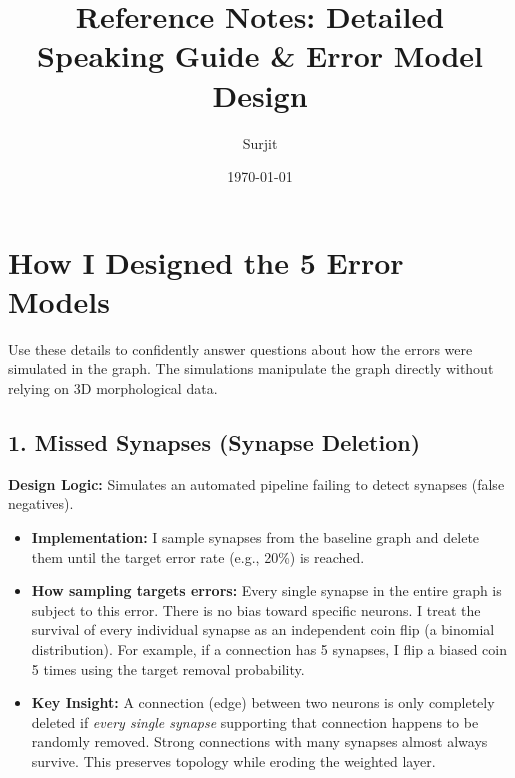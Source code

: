 \documentclass[11pt]{article}
\title{Reference Notes: Detailed Speaking Guide \& Error Model Design}
\author{Surjit}
\date{\today}
\begin{document}
\maketitle

\section{How I Designed the 5 Error Models}
Use these details to confidently answer questions about how the errors were simulated in the graph. The simulations manipulate the graph directly without relying on 3D morphological data.

\subsection*{1. Missed Synapses (Synapse Deletion)}
\textbf{Design Logic:} Simulates an automated pipeline failing to detect synapses (false negatives).
\begin{itemize}
    \item \textbf{Implementation:} I sample synapses from the baseline graph and delete them until the target error rate (e.g., 20\%) is reached.
    \item \textbf{How sampling targets errors:} Every single synapse in the entire graph is subject to this error. There is no bias toward specific neurons. I treat the survival of every individual synapse as an independent coin flip (a binomial distribution). For example, if a connection has 5 synapses, I flip a biased coin 5 times using the target removal probability.
    \item \textbf{Key Insight:} A connection (edge) between two neurons is only completely deleted if \emph{every single synapse} supporting that connection happens to be randomly removed. Strong connections with many synapses almost always survive. This preserves topology while eroding the weighted layer.
\end{itemize}
\end{document}
